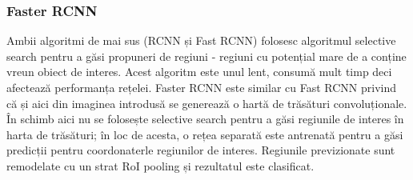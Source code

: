 \subsubsection{Faster RCNN}
Ambii algoritmi de mai sus (RCNN și Fast RCNN) folosesc algoritmul selective search pentru a găsi propuneri de regiuni - regiuni cu potențial mare de a conține vreun obiect de interes. Acest algoritm este unul lent, consumă mult timp deci afectează performanța rețelei.\newline
Faster RCNN este similar cu Fast RCNN privind că și aici din imaginea introdusă se generează o hartă de trăsături convoluționale. În schimb aici nu se folosește selective search pentru a găsi regiunile de interes în harta de trăsături; în loc de acesta, o rețea separată este antrenată pentru a găsi predicții pentru coordonaterle regiunilor de interes. Regiunile previzionate sunt remodelate cu un strat RoI pooling și rezultatul este clasificat.

